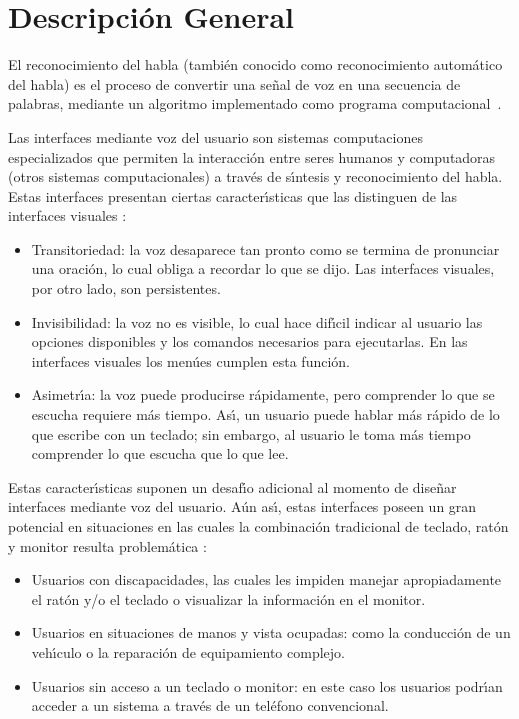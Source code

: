 \section{Descripci\'on General}
\label{sec:problema-general}

El reconocimiento del habla (tambi\'en conocido como reconocimiento autom\'atico del habla) es el proceso
de convertir una se\~nal de voz en una secuencia de palabras, mediante un algoritmo implementado
como programa \mbox{computacional \cite{JaisalAReview2012}}.

Las interfaces mediante voz del usuario son sistemas computaciones especializados que permiten la
interacci\'on entre seres humanos y computadoras (otros sistemas computacionales) a trav\'es de
s{\'\i}ntesis y reconocimiento del habla. Estas interfaces presentan ciertas caracter{\'\i}sticas que las
distinguen de las interfaces visuales \cite{GabrielVoice2007}:

\begin{itemize}
	\item Transitoriedad: la voz desaparece tan pronto como se termina de pronunciar una oraci\'on,
	lo cual obliga a recordar lo que se dijo. Las interfaces visuales, por otro lado, son persistentes.
	\item Invisibilidad: la voz no es visible, lo cual hace dif{\'\i}cil indicar al usuario las opciones
	disponibles y los comandos necesarios para ejecutarlas. En las interfaces visuales los men\'ues
	cumplen esta funci\'on.
	\item Asimetr{\'\i}a: la voz puede producirse r\'apidamente, pero comprender lo que se escucha requiere
	m\'as tiempo. As{\'\i}, un usuario puede hablar m\'as r\'apido de lo que escribe con un teclado; sin embargo,
	al usuario le toma m\'as tiempo comprender lo que escucha que lo que lee.
\end{itemize}

Estas caracter{\'\i}sticas suponen un desaf{\'\i}o adicional al momento de dise\~nar interfaces mediante voz del
usuario. A\'un as{\'\i}, estas interfaces poseen un gran potencial en situaciones en las cuales la
combinaci\'on tradicional de teclado, rat\'on y monitor resulta problem\'atica \cite{NielsenVoice2003}:

\begin{itemize}
	\item Usuarios con discapacidades, las cuales les impiden manejar apropiadamente el rat\'on y/o
	el teclado o visualizar la informaci\'on en el monitor.
	\item Usuarios en situaciones de manos y vista ocupadas: como la conducci\'on de un veh{\'\i}culo o
	la reparaci\'on de equipamiento complejo.
	\item Usuarios sin acceso a un teclado o monitor: en este caso los usuarios podr{\'\i}an acceder
	a un sistema a trav\'es de un tel\'efono convencional.
\end{itemize}

